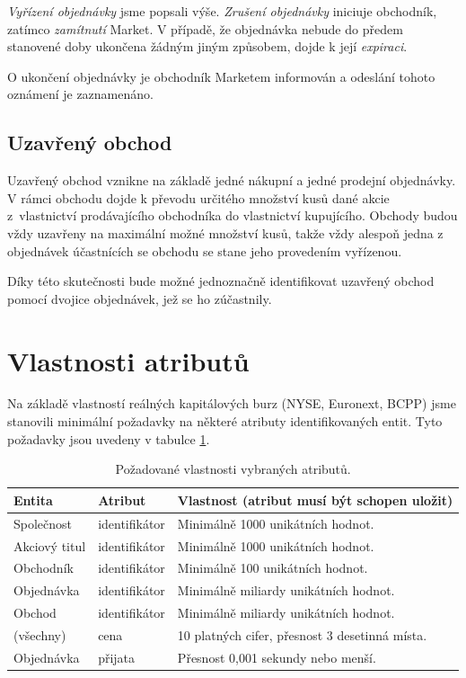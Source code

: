 \documentclass[thesis=M,czech]{FITthesis}[2012/06/26]
\begin{document}
\textit{Vyřízení objednávky} jsme popsali výše. \textit{Zrušení objednávky} iniciuje obchodník, zatímco \textit{zamítnutí} Market. 
V případě, že objednávka nebude do předem stanovené doby ukončena žádným jiným způsobem, dojde k její \textit{expiraci}.

O ukončení objednávky je obchodník Marketem informován a odeslání tohoto oznámení je zaznamenáno.


\subsection{Uzavřený obchod}

Uzavřený obchod vznikne na základě jedné nákupní a jedné prodejní objednávky. V rámci obchodu dojde k převodu určitého množství kusů 
dané akcie z~vlastnictví prodávajícího obchodníka do vlastnictví kupujícího. Obchody budou vždy uzavřeny na maximální možné množství 
kusů, takže vždy alespoň jedna z objednávek účastnících se obchodu se stane jeho provedením vyřízenou.

Díky této skutečnosti bude možné jednoznačně identifikovat uzavřený obchod pomocí dvojice objednávek, jež se ho zúčastnily. 



\section{Vlastnosti atributů} 

Na základě vlastností reálných kapitálových burz (NYSE, Euronext, BCPP) 
jsme stanovili minimální požadavky na některé atributy identifikovaných entit.
Tyto požadavky jsou uvedeny v tabulce \ref{tab:attributes}.

\begin{table}\centering
	\begin{tabular}{| l | l | l |}\hline
		Entita	 		& Atribut		& Vlastnost (atribut musí být schopen uložit)		\tabularnewline \hline \hline
		Společnost 		& identifikátor	& Minimálně 1000 unikátních hodnot.			\tabularnewline \hline 
		Akciový titul 		& identifikátor	& Minimálně 1000 unikátních hodnot.			\tabularnewline \hline 
		Obchodník 		& identifikátor	& Minimálně 100 unikátních hodnot.			\tabularnewline \hline 
		Objednávka 		& identifikátor	& Minimálně miliardy unikátních hodnot.			\tabularnewline \hline 
		Obchod 		& identifikátor	& Minimálně miliardy unikátních hodnot.			\tabularnewline \hline 
		(všechny) 		& cena		& 10 platných cifer, přesnost 3 desetinná místa.	\tabularnewline \hline 
		Objednávka 		& přijata		& Přesnost 0,001 sekundy nebo menší.			\tabularnewline \hline 
	\end{tabular}
	\caption[Požadované vlastnosti vybraných atributů.]{Požadované vlastnosti vybraných atributů.}
	\label{tab:attributes}
\end{table}
\end{document}
